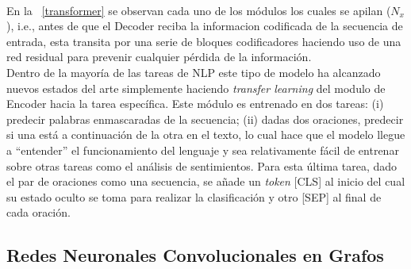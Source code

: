 	\\
	En la \figurename~\ref{transformer} se observan cada uno de los módulos los cuales se apilan ($N_x$), i.e., antes de que el Decoder reciba la informacion codificada de la secuencia de entrada, esta transita por una serie de bloques codificadores haciendo uso de una red residual para prevenir cualquier pérdida de la información.
	\\
	Dentro de la mayoría de las tareas de NLP este tipo de modelo ha alcanzado nuevos estados del arte simplemente haciendo \textit{transfer learning} del modulo de Encoder hacia la tarea específica. Este módulo es entrenado en dos tareas: (i) predecir palabras enmascaradas de la secuencia; (ii) dadas dos oraciones, predecir si una está a continuación de la otra en el texto, lo cual hace que el modelo llegue a ``entender'' el funcionamiento del lenguaje y sea relativamente fácil de entrenar sobre otras tareas como el análisis de sentimientos. Para esta última tarea, dado el par de oraciones como una secuencia, se añade un \textit{token} [CLS] al inicio del cual su estado oculto se toma para realizar la clasificación y otro [SEP] al final de cada oración. 
	
\subsection{Redes Neuronales Convolucionales en Grafos}
	
